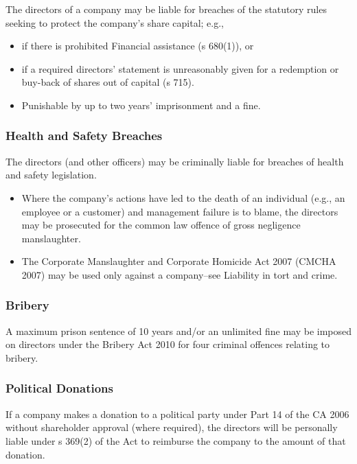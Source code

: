 \documentclass[
]{article}
\providecommand{\tightlist}{%
  \setlength{\itemsep}{0pt}\setlength{\parskip}{0pt}}
\begin{document}
The directors of a company may be liable for breaches of the statutory
rules seeking to protect the company's share capital; e.g.,

\begin{itemize}
\tightlist
\item
  if there is prohibited Financial assistance (s 680(1)), or
\item
  if a required directors' statement is unreasonably given for a
  redemption or buy-back of shares out of capital (s 715).
\item
  Punishable by up to two years' imprisonment and a fine.
\end{itemize}

\hypertarget{health-and-safety-breaches}{%
\subsubsection{Health and Safety
Breaches}\label{health-and-safety-breaches}}

The directors (and other officers) may be criminally liable for breaches
of health and safety legislation.

\begin{itemize}
\tightlist
\item
  Where the company's actions have led to the death of an individual
  (e.g., an employee or a customer) and management failure is to blame,
  the directors may be prosecuted for the common law offence of gross
  negligence manslaughter.
\item
  The Corporate Manslaughter and Corporate Homicide Act 2007 (CMCHA
  2007) may be used only against a company--see Liability in tort and
  crime.
\end{itemize}

\hypertarget{bribery}{%
\subsubsection{Bribery}\label{bribery}}

A maximum prison sentence of 10 years and/or an unlimited fine may be
imposed on directors under the Bribery Act 2010 for four criminal
offences relating to bribery.

\hypertarget{political-donations}{%
\subsubsection{Political Donations}\label{political-donations}}

If a company makes a donation to a political party under Part 14 of the
CA 2006 without shareholder approval (where required), the directors
will be personally liable under s 369(2) of the Act to reimburse the
company to the amount of that donation.
\end{document}
